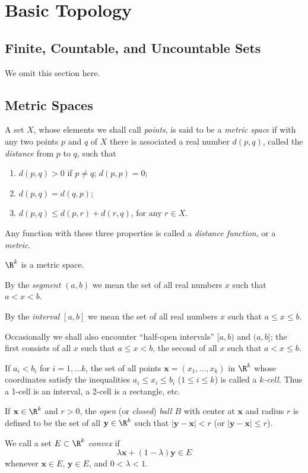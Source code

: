\clearpage
\section{Basic Topology}
\subsection{Finite, Countable, and Uncountable Sets}
We omit this section here.
\subsection{Metric Spaces}
\begin{definition}
A set $X$, whose elements we shall call \emph{points}, is said to be a \emph{metric space} if with any two points $p$ and $q$ of $X$ there is associated a real number $d(p,q)$, called the \emph{distance} from $p$ to $q$, such that
\begin{enumerate}
    \item[(a)] $d(p,q)>0$ if $p \neq q$; $d(p,p)=0$;
    \item[(b)] $d(p,q)=d(q,p)$;
    \item[(c)] $d(p,q) \leq d(p,r)+d(r,q)$, for any $r \in X$.  
\end{enumerate}

Any function with these three properties is called a \emph{distance function}, or a \emph{metric}.
\end{definition}
\begin{example}
$\R^k$ is a metric space.
\end{example}
\begin{definition}
By the \emph{segment} $(a,b)$ we mean the set of all real numbers $x$ such that $a<x<b$.

By the \emph{interval} $[a,b]$ we mean the set of all real numbers $x$ such that $a \leq x \leq b$.

Occasionally we shall also encounter ``half-open intervals'' $[a,b)$ and $(a,b]$; the first consists of all $x$ such that $a \leq x < b$, the second of all $x$ such that $a < x \leq b$.

If $a_i<b_i$ for $i=1, \ldots k$, the set of all points $\mathbf{x}=(x_1, \dots , x_k)$ in $\R^k$ whose coordinates satisfy the inequalities $a_i \leq x_i \leq b_i$ ($1 \leq i \leq k$) is called a \emph{$k$-cell}.
Thus a 1-cell is an interval, a 2-cell is a rectangle, etc.

If $\mathbf{x} \in \R^k$ and $r>0$, the \emph{open} (or \emph{closed}) \emph{ball $B$} with center at $\mathbf{x}$ and radius $r$ is defined to be the set of all $\mathbf{y} \in \R^k$ such that $|\mathbf{y}-\mathbf{x}|<r$ (or $|\mathbf{y}-\mathbf{x}| \leq r$).

We call a set $E \subset \R^k$ \emph{convex} if
\[
\lambda\mathbf{x}+(1-\lambda)\mathbf{y} \in E
\]
whenever $\mathbf{x} \in E$, $\mathbf{y} \in E$, and $0<\lambda<1$.
\end{definition}
